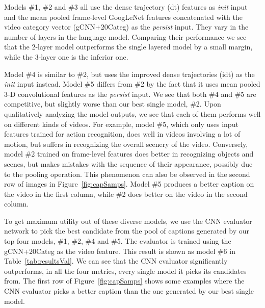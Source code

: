 Models \#1, \#2 and \#3 all use the dense trajectory (dt) features as
\emph{init} input and the mean pooled frame-level GoogLeNet features
concatenated with the video category vector (gCNN+20Categ) as the \emph{persist}
input.
They vary in the number of layers in the language model.
Comparing their performance we see that the 2-layer model outperforms the single
layered model by a small margin, while the 3-layer one is the inferior one.

Model \#4 is similar to \#2, but uses the improved dense trajectories (idt) as
the \emph{init} input instead.
Model \#5 differs from \#2 by the fact that it uses mean pooled 3-D
convolutional features as the \emph{persist} input.
We see that both \#4 and \#5 are competitive, but slightly worse than our best
single model, \#2.
Upon qualitatively analyzing the model outputs, we see that each of them
performs well on different kinds of videos.
For example, model \#5, which only uses input features trained for action
recognition, does well in videos involving a lot of motion, but suffers in
recognizing the overall scenery of the video.
Conversely, model \#2 trained on frame-level features does better in recognizing
objects and scenes, but makes mistakes with the sequence of their appearance,
possibly due to the pooling operation.
This phenomenon can also be observed in the second row of images in
Figure~\ref{fig:capSamps}. Model \#5 produces a better caption on the video in
the first column, while \#2 does better on the video in the second column.

To get maximum utility out of these diverse models, we use the CNN evaluator
network to pick the best candidate from the pool of captions generated by our
top four models, \#1, \#2, \#4 and \#5.
The evaluator is trained using the gCNN+20Categ as the video feature.
This result is shown as model \#6 in Table~\ref{tab:resultsVal}.
We can see that the CNN evaluator significantly outperforms, in all the four
metrics, every single model it picks its candidates from.
The first row of Figure~\ref{fig:capSamps} shows some examples where the CNN
evaluator picks a better caption than the one generated by our best single
model.

